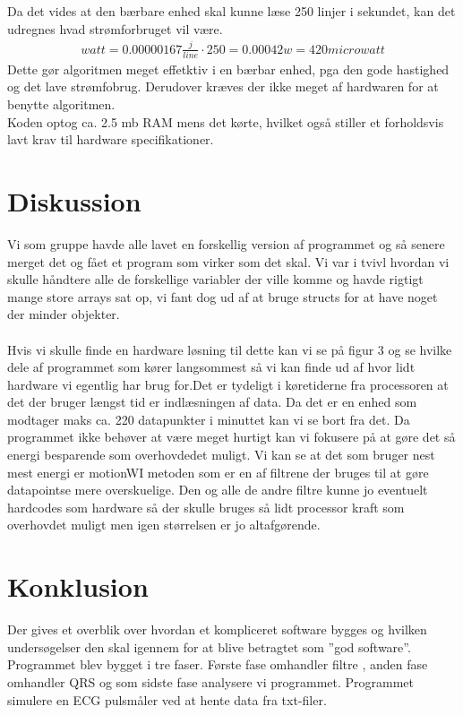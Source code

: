 \documentclass[a4paper,12pt]{article}
\begin{document}
Da det vides at den bærbare enhed skal kunne læse 250 linjer i sekundet, kan det udregnes hvad strømforbruget vil være.
\begin{align*}
watt = 0.00000167\frac{j}{line} \cdot 250 = 0.00042w = 420 microwatt
\end{align*}
Dette gør algoritmen meget effetktiv i en bærbar enhed, pga den gode hastighed og det lave strømfobrug. Derudover kræves der ikke meget af hardwaren for at benytte algoritmen.\\
Koden optog ca. 2.5 mb RAM mens det kørte, hvilket også stiller et forholdsvis lavt krav til hardware specifikationer. 
\newpage
\section{Diskussion}
Vi som gruppe havde alle lavet en forskellig version af programmet og så senere merget det og fået et program som virker som det skal. Vi var i tvivl hvordan vi skulle håndtere alle de forskellige variabler der ville komme og havde rigtigt mange store arrays sat op, vi fant dog ud af at bruge structs for at have noget der minder objekter.\\\\
Hvis vi skulle finde en hardware løsning til dette kan vi se på figur 3 og se hvilke dele af programmet som kører langsommest så vi kan finde ud af hvor lidt hardware vi egentlig har brug for.Det er tydeligt i køretiderne fra processoren
at det der bruger længst tid er indlæsningen af data. Da det er en enhed som modtager maks ca. 220 datapunkter i minuttet kan vi se bort fra det. Da programmet ikke behøver at være meget hurtigt kan vi fokusere på at gøre det så energi besparende som overhovdedet muligt. Vi kan se at det som bruger nest mest energi er motionWI metoden som er en af filtrene der bruges til at gøre datapointse mere overskuelige. Den og alle de andre filtre kunne jo eventuelt hardcodes som hardware så der skulle bruges så lidt processor kraft som overhovdet muligt men igen størrelsen er jo altafgørende.
\newpage
\section{Konklusion}
Der gives et overblik over hvordan et kompliceret software bygges og hvilken undersøgelser den skal igennem for at blive betragtet som ”god software”.  Programmet blev bygget i tre faser. Første fase omhandler filtre , anden fase omhandler QRS og som sidste fase analysere vi programmet. Programmet simulere en ECG pulsmåler ved at hente data fra txt-filer. \\
\end{document}
